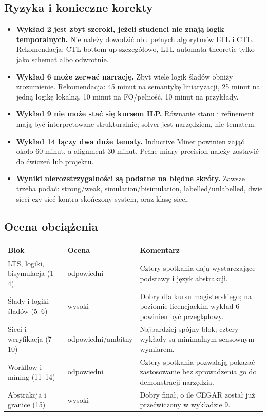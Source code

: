 \documentclass[11pt,a4paper]{article}
\newcommand{\warn}{\textcolor{redreview}{\textbf{[!]}}}
\begin{document}
\subsection{Ryzyka i konieczne korekty}
\begin{itemize}
\item[\warn] \textbf{Wykład 2 jest zbyt szeroki, jeżeli studenci nie znają logik temporalnych.} Nie należy dowodzić obu pełnych algorytmów LTL i CTL. Rekomendacja: CTL bottom-up szczegółowo, LTL automata-theoretic tylko jako schemat albo odwrotnie.
\item[\warn] \textbf{Wykład 6 może zerwać narrację.} Zbyt wiele logik śladów obniży zrozumienie. Rekomendacja: 45 minut na semantykę liniaryzacji, 25 minut na jedną logikę lokalną, 10 minut na FO/pełność, 10 minut na przykłady.
\item[\warn] \textbf{Wykład 9 nie może stać się kursem ILP.} Równanie stanu i refinement mają być interpretowane strukturalnie; solver jest narzędziem, nie tematem.
\item[\warn] \textbf{Wykład 14 łączy dwa duże tematy.} Inductive Miner powinien zająć około 60 minut, a alignment 30 minut. Pełne miary precision należy zostawić do ćwiczeń lub projektu.
\item[\warn] \textbf{Wyniki nierozstrzygalności są podatne na błędne skróty.} Zawsze trzeba podać: strong/weak, simulation/bisimulation, labelled/unlabelled, dwie sieci czy sieć kontra skończony system, oraz klasę sieci.
\end{itemize}

\subsection{Ocena obciążenia}
\begin{longtable}{@{}p{43mm}p{23mm}p{84mm}@{}}
\toprule
\textbf{Blok} & \textbf{Ocena} & \textbf{Komentarz}\\
\midrule
LTS, logiki, bisymulacja (1--4) & odpowiedni & Cztery spotkania dają wystarczające podstawy i język abstrakcji.\\
Ślady i logiki śladów (5--6) & wysoki & Dobry dla kursu magisterskiego; na poziomie licencjackim wykład 6 powinien być przeglądowy.\\
Sieci i weryfikacja (7--10) & odpowiedni/ambitny & Najbardziej spójny blok; cztery wykłady są minimalnym sensownym wymiarem.\\
Workflow i mining (11--14) & odpowiedni & Cztery spotkania pozwalają pokazać zastosowanie bez sprowadzenia go do demonstracji narzędzia.\\
Abstrakcja i granice (15) & wysoki & Dobry finał, o ile CEGAR został już przećwiczony w wykładzie 9.\\
\bottomrule
\end{longtable}
\end{document}
